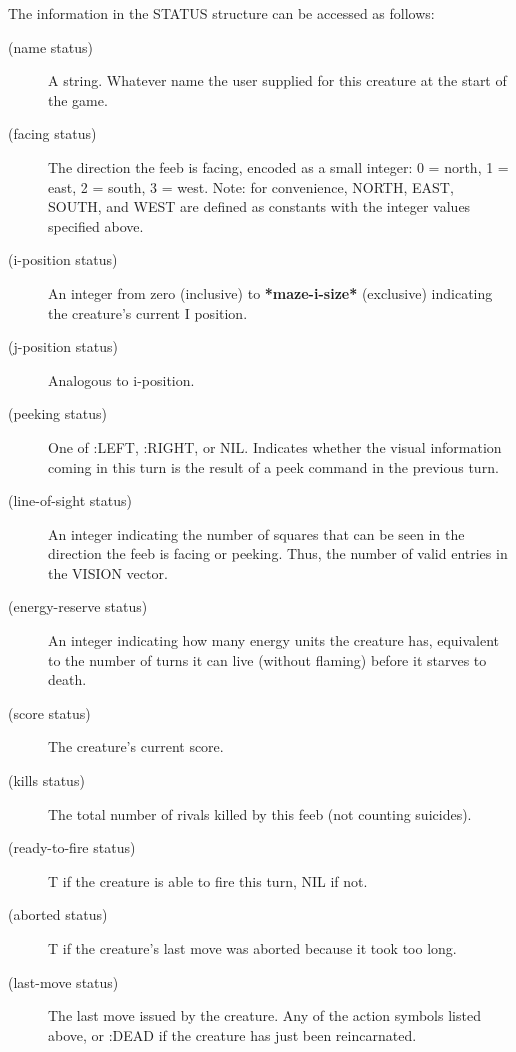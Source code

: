 \documentclass[12pt]{article}
\begin{document}
The information in the STATUS structure can be accessed as follows:

\begin{description}

\item[(name status)] A string.  Whatever name the user supplied for
this creature at the start of the game.

\item[(facing status)] The direction the feeb is facing, encoded as a
small integer: 0 = north, 1 = east, 2 = south, 3 = west.  Note: for
convenience, NORTH, EAST, SOUTH, and WEST are defined as constants
with the integer values specified above.

\item[(i-position status)] An integer from zero (inclusive) to {\bf
*maze-i-size*} (exclusive) indicating the creature's current I
position.

\item[(j-position status)] Analogous to i-position.

\item[(peeking status)] One of :LEFT, :RIGHT, or NIL.  Indicates
whether the visual information coming in this turn is the result of a
peek command in the previous turn.

\item[(line-of-sight status)] An integer indicating the number of
squares that can be seen in the direction the feeb is facing or
peeking.  Thus, the number of valid entries in the VISION vector.

\item[(energy-reserve status)] An integer indicating how many energy
units the creature has, equivalent to the number of turns it can live
(without flaming) before it starves to death.

\item[(score status)] The creature's current score.

\item[(kills status)] The total number of rivals killed by this feeb
(not counting suicides).

\item[(ready-to-fire status)] T if the creature is able to fire this
turn, NIL if not.

\item[(aborted status)] T if the creature's last move was aborted
because it took too long.

\item[(last-move status)] The last move issued by the creature.  Any
of the action symbols listed above, or :DEAD if the creature has just
been reincarnated.
\end{description}
\end{document}
